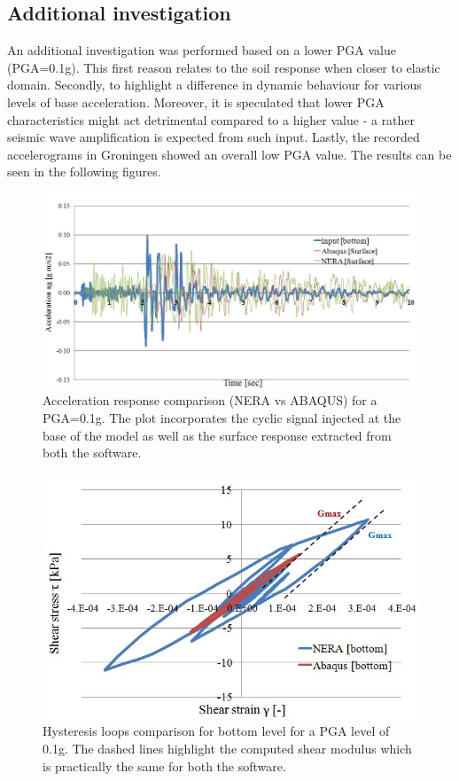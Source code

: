 	\newpage
	\subsection{Additional investigation}
	An additional investigation was performed based on a lower PGA value (PGA=0.1g). This first reason relates to the soil response when closer to elastic domain. Secondly, to highlight a difference in dynamic behaviour for various levels of base acceleration. Moreover, it is speculated that lower PGA characteristics might act detrimental compared to a higher value - a rather seismic wave amplification is expected from such input. Lastly, the recorded accelerograms in Groningen showed an overall low PGA value. The results can be seen in the following figures.
	
	\begin{figure}[!h]
		\centering
		\includegraphics[width=0.7\linewidth]{"acc_low"}
		\caption{Acceleration response comparison (NERA vs ABAQUS) for a PGA=0.1g. The plot incorporates the cyclic signal injected at the base of the model as well as the surface response extracted from both the software.}
		\label{acc_low}
	\end{figure}
	
	\begin{figure}[!h]
		\centering
		\includegraphics[width=0.6\linewidth]{"hysteresis_low_bot"}
		\caption{Hysteresis loops comparison for bottom level for a PGA level of 0.1g. The dashed lines highlight the computed shear modulus which is practically the same for both the software.}
		\label{hyst_bot}
	\end{figure}
	
